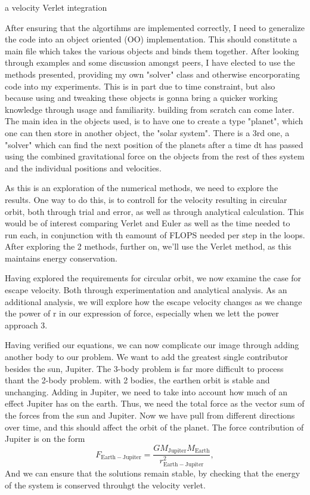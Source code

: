 \documentclass[10pt, twocolumn]{revtex4-1}
\begin{document}
\begin{algorithm}
    \caption{a velocity Verlet integration}
\end{algorithm}

After ensuring that the algortihms are implemented correctly, I need to generalize the code into an object oriented (OO)
implementation. This should constitute a main file which takes the various objects and binds them together. After looking
through examples and some discussion amongst peers, I have elected to use the methods presented, providing my own "solver" class
and otherwise encorporating code into my experiments. This is in part due to time constraint, but also because using and tweaking
these objects is gonna bring a quicker working knowledge through usage and familiarity. building from scratch can come later.
The main idea in the objects used, is to have one to create a type "planet", which one can then store in another object, the 
"solar system". There is a 3rd one, a "solver" which can find the next position of the planets after a time dt has passed using
the combined gravitational force on the objects from the rest of thes system and the individual positions and velocities. 

As this is an exploration of the numerical methods, we need to explore the results. One way to do this, is to controll for the 
velocity resulting in circular orbit, both through trial and error, as well as through analytical calculation. This would be of interest
comparing Verlet and Euler as well as the time needed to run each, in conjunction with th eamount of FLOPS needed per step in the loops. 
After exploring the 2 methods, further on, we'll use the Verlet method, as this maintains energy conservation. 

Having explored the requirements for circular orbit, we now examine the case for escape velocity. Both through experimentation and analytical analysis. 
As an additional analysis, we will explore how the escape velocity changes as we change the power of r in our expression of force, especially when we lett 
the power approach 3. 

Having verified our equations, we can now complicate our image through adding another body to our problem. We want to add the greatest single contributor
besides the sun, Jupiter. The 3-body problem is far more difficult to process thant the 2-body problem. with 2 bodies, the earthen orbit is stable and
unchanging. Adding in Jupiter, we need to take into account how much of an effect Jupiter has on the earth. Thus, we need the total force as the 
vector sum of the forces from the sun and Jupiter. Now we have pull from different directions over time, and this should affect the orbit of the planet.
The force contribution of Jupiter is on the form
\[
F_{\mathrm{Earth-Jupiter}}=\frac{GM_{\mathrm{Jupiter}}M_{\mathrm{Earth}}}{r_{\mathrm{Earth-Jupiter}}^2},
\]
And we can ensure that the solutions remain stable, by checking that the energy of the system is conserved throuhgt the velocity verlet. 
\end{document}
